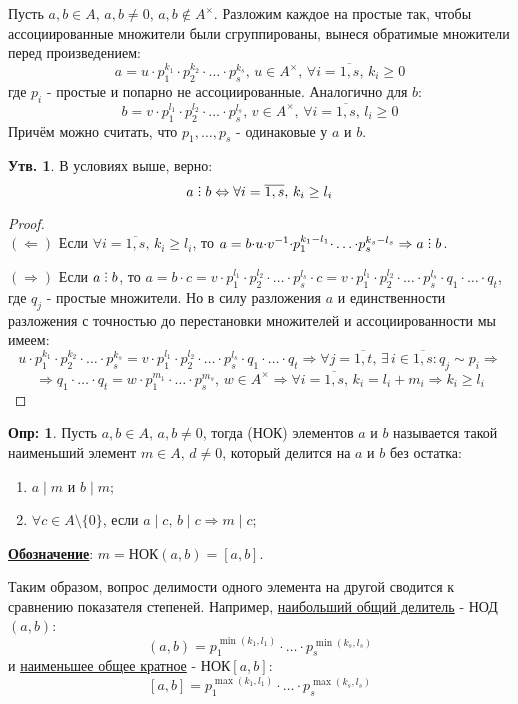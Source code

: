 \documentclass[12pt]{article}
\theoremstyle{definition}
\newtheorem{defn}{Опр:}
\newtheorem{prop}{Утв.}
\DeclareRobustCommand{\divby}{%
	\mathrel{\text{\vbox{\baselineskip.65ex\lineskiplimit0pt\hbox{.}\hbox{.}\hbox{.}}}}%
}
\newcommand{\ovl}[1]{\overline{#1}}
\begin{document}
Пусть $a,b \in A,\, a,b \neq 0, \, a,b \not\in A^{\times}$. Разложим каждое на простые так, чтобы ассоциированные множители были сгруппированы, вынеся обратимые множители перед произведением:
$$
	a = u{\cdot}p_1^{k_1}{\cdot}p_2^{k_2}{\cdot}\dotsc{\cdot}p_s^{k_s}, \, u \in A^{\times}, \, \forall i = \ovl{1,s}, \, k_i \geq 0
$$
где $p_i$ - простые и попарно не ассоциированные. Аналогично для $b$:
$$
	b = v{\cdot}p_1^{l_1}{\cdot}p_2^{l_2}{\cdot}\dotsc{\cdot}p_s^{l_s}, \, v \in A^{\times}, \, \forall i = \ovl{1,s}, \, l_i \geq 0
$$
Причём можно считать, что $p_1, \dotsc, p_s$ - одинаковые у $a$ и $b$.
\begin{prop}
	В условиях выше, верно:
	$$
		a\divby b \Leftrightarrow \forall i = \ovl{1,s}, \, k_i \geq l_i
	$$
\end{prop}
\begin{proof}\hfill\\
	$(\Leftarrow)$ Если $\forall i = \ovl{1,s}, \, k_i \geq l_i$, то $a = b{\cdot}u{\cdot}v^{-1}{\cdot}p_1^{k_1 - l_1}{\cdot}\dotsc{\cdot}p_s^{k_s - l_s} \Rightarrow a \divby b$.
	
	$(\Rightarrow)$ Если $a \divby b$, то $a = b{\cdot}c = 			v{\cdot}p_1^{l_1}{\cdot}p_2^{l_2}{\cdot}\dotsc{\cdot}p_s^{l_s}{\cdot}c = v{\cdot}p_1^{l_1}{\cdot}p_2^{l_2}{\cdot}\dotsc{\cdot}p_s^{l_s}{\cdot}q_1{\cdot}\dotsc{\cdot}q_t$, где $q_j$ - простые множители. Но в силу разложения $a$ и единственности разложения с точностью до перестановки множителей и ассоциированности мы имеем:
	$$
		u{\cdot}p_1^{k_1}{\cdot}p_2^{k_2}{\cdot}\dotsc{\cdot}p_s^{k_s} = v{\cdot}p_1^{l_1}{\cdot}p_2^{l_2}{\cdot}\dotsc{\cdot}p_s^{l_s}{\cdot}q_1{\cdot}\dotsc{\cdot}q_t \Rightarrow \forall j = \ovl{1,t}, \, \exists \, i \in \ovl{1,s} \colon q_j \sim p_i \Rightarrow
	$$
	$$
		\Rightarrow q_1{\cdot}\dotsc{\cdot}q_t = w{\cdot}p_1^{m_1}{\cdot}\dotsc{\cdot}p_s^{m_s}, \, w \in A^{\times} \Rightarrow \forall i = \ovl{1,s}, \, k_i = l_i + m_i \Rightarrow k_i \geq l_i
	$$
\end{proof}

\begin{defn}
	Пусть $a,b \in A,\, a,b \neq 0$, тогда  (НОК) элементов $a$ и $b$ называется такой наименьший элемент $m \in A, \, d\neq 0$, который делится на $a$ и $b$ без остатка:
	\begin{enumerate}[label=\arabic*)]
		\item $a \mid m$ и $b\mid m$;
		\item $\forall c \in A\setminus \{0\}$, если $a \mid c, \, b\mid c \Rightarrow m \mid c$;
	\end{enumerate}
	\textbf{\uline{Обозначение}}: $m = \text{НОК}(a,b) = [a,b]$.
\end{defn}
Таким образом, вопрос делимости одного элемента на другой сводится к сравнению показателя степеней. Например, \uline{наибольший общий делитель} - НОД$(a,b)$: 
$$
	(a,b)= p_1^{\min(k_1,l_1)}{\cdot}\dotsc{\cdot}p_s^{\min(k_s,l_s)}
$$ 
и \uline{наименьшее общее кратное} - НОК$[a,b]$: 
$$
	[a,b] = p_1^{\max(k_1,l_1)}{\cdot}\dotsc{\cdot}p_s^{\max(k_s,l_s)}
$$
\end{document}
